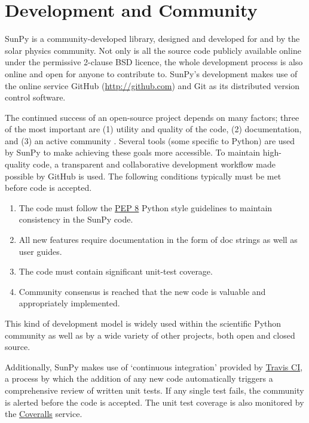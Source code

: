 \section{Development and Community}\label{sec:dev}
SunPy is a community-developed library, designed and developed for and by 
the solar physics community. Not only is all the source code publicly available 
online under the permissive 2-clause BSD licence, the whole 
development process is also online and open for anyone to contribute to.
SunPy's development makes use of the online service 
GitHub (\href{http://github.com}{http://github.com}) and Git
as its distributed version control software. 

The continued success of an open-source project depends on many factors;
three of the most important are (1) utility and quality of the code, (2) documentation, and (3) an
active community \citep{bangerth2013}. Several tools (some specific to Python) are used by
SunPy to make achieving these goals more accessible. To maintain high-quality code, a 
transparent and collaborative development workflow made possible by GitHub is used.
The following conditions typically must be met before code is accepted.
\begin{enumerate}
	\item  The code must follow the
	\href{http://www.python.org/dev/peps/pep-0008/}{PEP 8} Python style 
	guidelines to maintain consistency in the SunPy code.
	
	\item All new features require documentation in the form of doc strings as well as user
	guides. 
	
	\item The code must contain significant unit-test coverage.

        \item Community consensus is reached that the new code is valuable and appropriately implemented.
\end{enumerate}
This kind of development model is widely used within the scientific Python 
community as well as by a wide variety of other projects, both open and closed 
source.

Additionally, SunPy makes use of `continuous integration' provided by
\href{http://travis-ci.org}{Travis CI}, a process by which the addition of any new code 
automatically triggers a comprehensive review of written unit tests. If any single test
fails, the community is alerted before the code is accepted. The unit test coverage is
also monitored by the \href{http://coveralls.io}{Coveralls} service.

